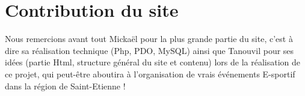 \documentclass[a4paper, 11pt]{article}
\begin{document}



\section{Contribution du site}
Nous remercions avant tout Mickaël pour la plus grande partie du site, c'est à dire sa réalisation technique (Php, PDO, MySQL) ainsi que Tanouvil pour ses idées (partie Html, structure général du site et contenu) lors de la réalisation de ce projet, qui peut-être aboutira à l'organisation de vrais événements E-sportif dans la région de Saint-Etienne !
\end{document}
